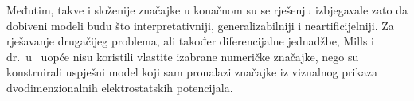 \par

Međutim, takve i složenije značajke u konačnom su se rješenju izbjegavale zato da dobiveni modeli budu što interpretativniji, generalizabilniji i neartificijelniji. Za rješavanje drugačijeg problema, ali također diferencijalne jednadžbe, Mills i dr.\ u~\cite{bib:Mills17} uopće nisu koristili vlastite izabrane numeričke značajke, nego su konstruirali uspješni model koji sam pronalazi značajke iz vizualnog prikaza dvodimenzionalnih elektrostatskih potencijala.

\par
